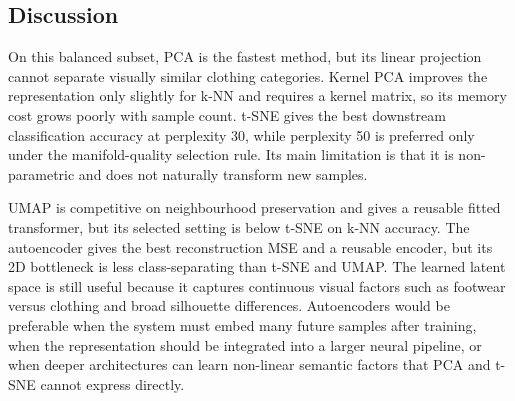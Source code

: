 \subsection{Discussion}

On this balanced subset, PCA is the fastest method, but its linear projection cannot separate visually similar clothing categories. Kernel PCA improves the representation only slightly for k-NN and requires a kernel matrix, so its memory cost grows poorly with sample count. t-SNE gives the best downstream classification accuracy at perplexity 30, while perplexity 50 is preferred only under the manifold-quality selection rule. Its main limitation is that it is non-parametric and does not naturally transform new samples.

UMAP is competitive on neighbourhood preservation and gives a reusable fitted transformer, but its selected setting is below t-SNE on k-NN accuracy. The autoencoder gives the best reconstruction MSE and a reusable encoder, but its 2D bottleneck is less class-separating than t-SNE and UMAP. The learned latent space is still useful because it captures continuous visual factors such as footwear versus clothing and broad silhouette differences. Autoencoders would be preferable when the system must embed many future samples after training, when the representation should be integrated into a larger neural pipeline, or when deeper architectures can learn non-linear semantic factors that PCA and t-SNE cannot express directly.
